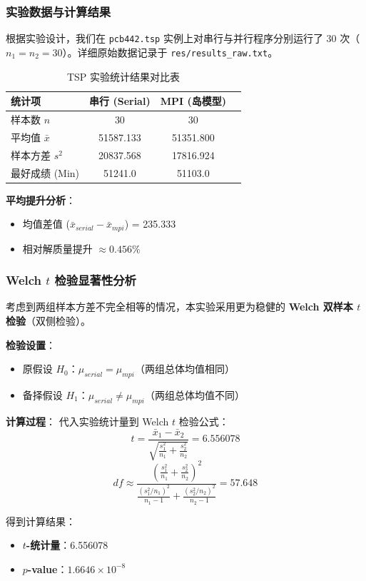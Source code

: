 \documentclass[11pt,a4paper]{article}
\begin{document}
\subsubsection{实验数据与计算结果}
根据实验设计，我们在 \texttt{pcb442.tsp} 实例上对串行与并行程序分别运行了 30 次（$n_1=n_2=30$）。详细原始数据记录于 \texttt{res/results\_raw.txt}。

\begin{table}[h]
\centering
\begin{tabular}{@{}lccc@{}}
\toprule
统计项 & 串行 (Serial) & MPI (岛模型) \\ \midrule
样本数 $n$ & 30 & 30 \\
平均值 $\bar{x}$ & 51587.133 & 51351.800 \\
样本方差 $s^2$ & 20837.568 & 17816.924 \\
最好成绩 (Min) & 51241.0 & 51103.0 \\ \bottomrule
\end{tabular}
\caption{TSP 实验统计结果对比表}
\end{table}

\textbf{平均提升分析}：
\begin{itemize}
    \item 均值差值 ($\bar{x}_{serial} - \bar{x}_{mpi}$) = 235.333
    \item 相对解质量提升 $\approx 0.456\%$
\end{itemize}

\subsubsection{Welch $t$ 检验显著性分析}
考虑到两组样本方差不完全相等的情况，本实验采用更为稳健的 \textbf{Welch 双样本 $t$ 检验}（双侧检验）。

\textbf{检验设置}：
\begin{itemize}
    \item 原假设 $H_0$：$\mu_{serial} = \mu_{mpi}$（两组总体均值相同）
    \item 备择假设 $H_1$：$\mu_{serial} \neq \mu_{mpi}$（两组总体均值不同）
\end{itemize}

\textbf{计算过程}：
代入实验统计量到 Welch $t$ 检验公式：
$$t = \frac{\bar{x}_1 - \bar{x}_2}{\sqrt{\frac{s_1^2}{n_1} + \frac{s_2^2}{n_2}}} = 6.556078$$
$$df \approx \frac{\left(\frac{s_1^2}{n_1} + \frac{s_2^2}{n_2}\right)^2}{\frac{(s_1^2/n_1)^2}{n_1-1} + \frac{(s_2^2/n_2)^2}{n_2-1}} = 57.648$$

得到计算结果：
\begin{itemize}
    \item \textbf{$t$-统计量}：6.556078
    \item \textbf{$p$-value}：$1.6646 \times 10^{-8}$
\end{itemize}
\end{document}
